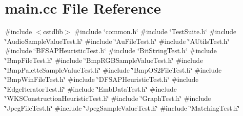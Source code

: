 \section{main.\+cc File Reference}
\label{tests_2main_8cc}
{\ttfamily \#include $<$cstdlib$>$}\newline
{\ttfamily \#include \char`\"{}common.\+h\char`\"{}}\newline
{\ttfamily \#include \char`\"{}Test\+Suite.\+h\char`\"{}}\newline
{\ttfamily \#include \char`\"{}Audio\+Sample\+Value\+Test.\+h\char`\"{}}\newline
{\ttfamily \#include \char`\"{}Au\+File\+Test.\+h\char`\"{}}\newline
{\ttfamily \#include \char`\"{}A\+Utils\+Test.\+h\char`\"{}}\newline
{\ttfamily \#include \char`\"{}B\+F\+S\+A\+P\+Heuristic\+Test.\+h\char`\"{}}\newline
{\ttfamily \#include \char`\"{}Bit\+String\+Test.\+h\char`\"{}}\newline
{\ttfamily \#include \char`\"{}Bmp\+File\+Test.\+h\char`\"{}}\newline
{\ttfamily \#include \char`\"{}Bmp\+R\+G\+B\+Sample\+Value\+Test.\+h\char`\"{}}\newline
{\ttfamily \#include \char`\"{}Bmp\+Palette\+Sample\+Value\+Test.\+h\char`\"{}}\newline
{\ttfamily \#include \char`\"{}Bmp\+O\+S2\+File\+Test.\+h\char`\"{}}\newline
{\ttfamily \#include \char`\"{}Bmp\+Win\+File\+Test.\+h\char`\"{}}\newline
{\ttfamily \#include \char`\"{}D\+F\+S\+A\+P\+Heuristic\+Test.\+h\char`\"{}}\newline
{\ttfamily \#include \char`\"{}Edge\+Iterator\+Test.\+h\char`\"{}}\newline
{\ttfamily \#include \char`\"{}Emb\+Data\+Test.\+h\char`\"{}}\newline
{\ttfamily \#include \char`\"{}W\+K\+S\+Construction\+Heuristic\+Test.\+h\char`\"{}}\newline
{\ttfamily \#include \char`\"{}Graph\+Test.\+h\char`\"{}}\newline
{\ttfamily \#include \char`\"{}Jpeg\+File\+Test.\+h\char`\"{}}\newline
{\ttfamily \#include \char`\"{}Jpeg\+Sample\+Value\+Test.\+h\char`\"{}}\newline
{\ttfamily \#include \char`\"{}Matching\+Test.\+h\char`\"{}}\newline
